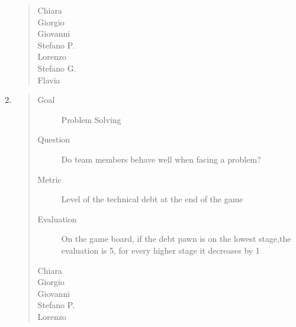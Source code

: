 \documentclass[letterpaper,10pt,italian]{sphinxmanual}
\begin{document}
\begin{enumerate}
\begin{quote}
\begin{description}
\item[{Chiara}] \leavevmode
{}

\item[{Giorgio}] \leavevmode
{}

\item[{Giovanni}] \leavevmode
{}

\item[{Stefano P.}] \leavevmode
{}

\item[{Lorenzo}] \leavevmode
{}

\item[{Stefano G.}] \leavevmode
{}

\item[{Flavia}] \leavevmode
{}

\end{description}\end{quote}

\item {} \begin{quote}\begin{description}
\item[{Goal}] \leavevmode
\sphinxAtStartPar
Problem Solving

\item[{Question}] \leavevmode
\sphinxAtStartPar
Do team members behave well when facing a problem?

\item[{Metric}] \leavevmode
\sphinxAtStartPar
Level of the technical debt at the end of the game

\item[{Evaluation}] \leavevmode
\sphinxAtStartPar
On the game board, if the debt pawn is on the lowest stage,the evaluation is 5, for every higher stage it decreases by 1

\item[{Chiara}] \leavevmode
{}

\item[{Giorgio}] \leavevmode
{}

\item[{Giovanni}] \leavevmode
{}

\item[{Stefano P.}] \leavevmode
{}

\item[{Lorenzo}] \leavevmode
{}


\end{description}
\end{quote}
\end{enumerate}
\end{document}
